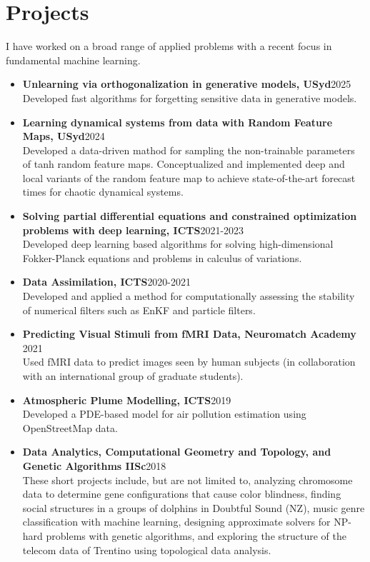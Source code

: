 \documentclass[a4paper, 11pt]{article}
\begin{document}
\section*{Projects}
I have worked on a broad range of applied problems with a recent focus in fundamental machine learning. 
\begin{itemize}
    \item \textbf{Unlearning via orthogonalization in generative models, USyd}\hfill 2025\\
    Developed fast algorithms for forgetting sensitive data in generative models.

     \item \textbf{Learning dynamical systems from data with Random Feature Maps, USyd}\hfill 2024\\
    Developed a data-driven mathod for sampling the non-trainable parameters of tanh random feature maps. Conceptualized and implemented deep and local variants of the random feature map to achieve state-of-the-art forecast times for chaotic dynamical systems.

    \item \textbf{Solving partial differential equations and constrained optimization problems with deep learning, ICTS}\hfill 2021-2023\\
    Developed deep learning based algorithms for solving high-dimensional Fokker-Planck equations and problems in calculus of variations.

    \item \textbf{Data Assimilation, ICTS}\hfill 2020-2021\\
    Developed and applied a method for computationally assessing the stability of numerical filters such as EnKF and particle filters.
    
    \item \textbf{Predicting Visual Stimuli from fMRI Data, Neuromatch Academy }\hfill2021\\
    Used fMRI data to predict images seen by human subjects (in collaboration with an international group of graduate students).
    
    \item \textbf{Atmospheric Plume Modelling, ICTS}\hfill2019\\
    Developed a PDE-based model for air pollution estimation using OpenStreetMap data.
    
    \item \textbf{Data Analytics, Computational Geometry and Topology, and Genetic Algorithms IISc}\hfill 2018\\
    These short projects include, but are not limited to, analyzing chromosome data to determine gene configurations that cause color blindness, finding social structures in a groups of dolphins in Doubtful Sound (NZ), music genre classification with machine learning, designing approximate solvers for NP-hard problems with genetic algorithms, and exploring the structure of the telecom data of Trentino using topological data analysis.
\end{itemize}
\end{document}
